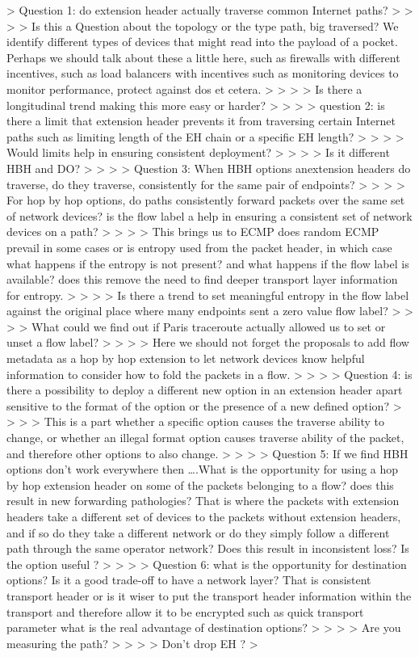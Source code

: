 > Question 1: do extension header actually traverse common Internet paths? 
> 
> 
> 
> Is this a Question about the topology  or  the type path, big traversed? We identify different types of devices that might read into the payload of a pocket. Perhaps we should talk about these a little here, such as firewalls with different incentives, such as load balancers with incentives such as monitoring devices to monitor performance, protect against dos et cetera.
> 
> 
> 
> Is there a longitudinal trend making this more easy or harder?
> 
> 
> 
>  question 2: is there a limit that extension header prevents it from traversing certain Internet paths such as limiting length of the EH chain or a specific EH length?
> 
> 
> 
> Would limits help in ensuring consistent deployment?
> 
> 
> 
> Is it different HBH and DO?
> 
> 
> 
> Question 3: When HBH options anextension headers do traverse, do they traverse, consistently for the same pair of endpoints?
> 
> 
> 
> For hop by hop options, do paths consistently forward packets over the same set of network devices? is the flow label a help in ensuring a consistent set of network devices on a path?
> 
> 
> 
> This brings us to ECMP does random ECMP prevail in some cases or is entropy used from the packet header, in which case what happens if the entropy is not present? and what happens if the flow label  is available? does this remove the need to find deeper transport layer information for entropy.
> 
> 
> 
> Is there a trend to set meaningful entropy in the flow label against the original place where many endpoints sent a zero value flow label?
> 
> 
> 
> What could we find out if Paris traceroute  actually allowed us to set or unset a flow label?
> 
> 
> 
> Here we should not forget the proposals to add flow metadata  as a hop by hop extension to let network devices know helpful information to consider how to fold the packets in a flow.
> 
> 
> 
> Question 4: is there a possibility to deploy a different new option in an extension header apart sensitive to the format of the option or the presence of a new defined option?
> 
> 
> 
> This is a part whether a specific option causes the traverse ability to change, or whether an illegal format option causes traverse ability of the packet, and therefore other options to also change.
> 
> 
> 
> Question 5: If we find HBH options don’t work everywhere then ….What is the opportunity for using a hop by hop extension header on some of the packets belonging to a flow? does this result in new forwarding pathologies? That is where the packets with extension headers take a different set of devices to the packets without extension headers, and if so do they take a different network or do they simply follow a different path through the same operator network? Does this result in inconsistent loss? Is the option useful ?
> 
> 
> 
> Question 6: what is the opportunity for destination options? Is it a good trade-off to have a network layer? That is consistent transport header or is it wiser to put the transport header information within the transport and therefore allow it to be encrypted such as quick transport parameter what is the real advantage of destination options?
> 
> 
> 
> Are you measuring the path?
> 
> 
> 
> Don’t drop EH ?
> 